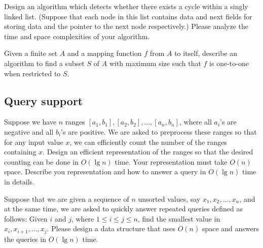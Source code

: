 \begin{refsection}
\begin{Exercise}
Design an algorithm which detects whether there exists a cycle within a singly linked list. (Suppose that each node in this list contains data and next fields for storing data and the pointer to the next node respectively.) Please analyze the time and space complexities of your algorithm. 
\end{Exercise}
\begin{Answer}
\end{Answer}

\begin{Exercise}
Given a finite set $A$ and a mapping function $f$ from $A$ to itself, describe an algorithm to find a subset $S$ of $A$ with maximum size such that $f$ is one-to-one when restricted to $S$.
\end{Exercise}
\begin{Answer}
\end{Answer}

\subsection{Query support}

\begin{Exercise}
Suppose we have $n$ ranges $[a_1, b_1], [a_2, b_2], \dots, [a_n, b_n]$, where all $a_i$'s are negative and all $b_i$'s are positive. We are asked to preprocess these ranges so that for any input value $x$, we can efficiently count the number of the ranges containing $x$. Design an efficient representation of the ranges so that the desired counting can be done in $O(\lg n)$ time. Your representation must take $O(n)$ space. Describe you representation and how to answer a query in $O(\lg n)$ time in details. 
\end{Exercise}
\begin{Answer}
\end{Answer}

\begin{Exercise}
Suppose that we are given a sequence of $n$ unsorted values, say $x_1, x_2, \dots, x_n$, and at the same time, we are asked to quickly answer repeated queries defined as follows: Given $i$ and $j$, where $1 \leq i \leq j \leq n$, find the smallest value in $x_i, x_{i+1}, \dots, x_j$. Please design a data structure that uses $O(n)$ space and answers the queries in $O(\lg n)$ time. 
\end{Exercise}
\begin{Answer}
\end{Answer}


\printbibliography[heading=subbibliography]
\end{refsection}

